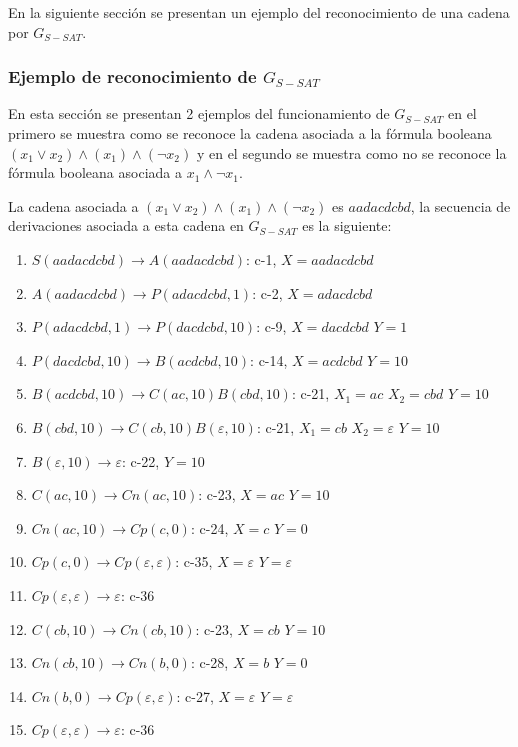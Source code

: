 \documentclass[12pt]{article}
\begin{document}
En la siguiente sección se presentan un ejemplo del reconocimiento de una cadena por $G_{S-SAT}$.

\subsubsection{Ejemplo de reconocimiento de $G_{S-SAT}$}

En esta sección se presentan 2 ejemplos del funcionamiento de $G_{S-SAT}$ en el primero se muestra como se
reconoce la cadena asociada a la fórmula booleana $(x_1 \vee x_2) \wedge (x_1) \wedge (\neg x_2)$ y en el
segundo se muestra como no se reconoce la fórmula booleana asociada a $x_1 \wedge \neg x_1$.

La cadena asociada a $(x_1 \vee x_2) \wedge (x_1) \wedge (\neg x_2)$ es $aadacdcbd$, la secuencia de derivaciones
asociada a esta cadena en $G_{S-SAT}$ es la siguiente:

\begin{enumerate}
    \item $S(aadacdcbd)\to A(aadacdcbd)$: c-1, $X=aadacdcbd$
    \item $A(aadacdcbd)\to P(adacdcbd,1)$: c-2, $X=adacdcbd$
    \item $P(adacdcbd,1)\to P(dacdcbd,10)$: c-9, $X=dacdcbd$ $Y=1$
    \item $P(dacdcbd,10)\to B(acdcbd, 10)$: c-14, $X=acdcbd$ $Y=10$
    \item $B(acdcbd, 10)\to C(ac,10) B(cbd,10)$: c-21, $X_1=ac$ $X_2=cbd$ $Y=10$
    \item $B(cbd,10)\to C(cb,10) B(\varepsilon,10)$: c-21, $X_1=cb$ $X_2=\varepsilon$ $Y=10$
    \item $B(\varepsilon,10)\to \varepsilon$: c-22, $Y=10$
    \item $C(ac,10)\to Cn(ac,10)$: c-23, $X=ac$ $Y=10$
    \item $Cn(ac,10)\to Cp(c,0)$: c-24, $X=c$ $Y=0$
    \item $Cp(c,0)\to Cp(\varepsilon,\varepsilon)$: c-35, $X=\varepsilon$ $Y=\varepsilon$
    \item $Cp(\varepsilon, \varepsilon) \to \varepsilon$: c-36
    \item $C(cb,10)\to Cn(cb,10)$: c-23, $X=cb$ $Y=10$
    \item $Cn(cb,10)\to Cn(b,0)$: c-28, $X=b$ $Y=0$
    \item $Cn(b,0)\to Cp(\varepsilon,\varepsilon)$: c-27, $X=\varepsilon$ $Y=\varepsilon$
    \item $Cp(\varepsilon, \varepsilon) \to \varepsilon$: c-36
\end{enumerate}
\end{document}
